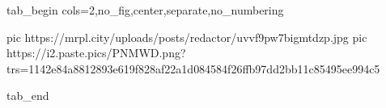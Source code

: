  
 
 
 
 


\ifcmt
  tab_begin cols=2,no_fig,center,separate,no_numbering

    pic https://mrpl.city/uploads/posts/redactor/uvvf9pw7bigmtdzp.jpg
    pic https://i2.paste.pics/PNMWD.png?trs=1142e84a8812893e619f828af22a1d084584f26ffb97dd2bb11c85495ee994c5

  tab_end
\fi
